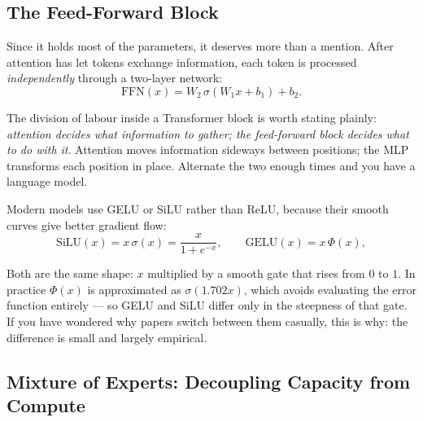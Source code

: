 \subsection{The Feed-Forward Block}

Since it holds most of the parameters, it deserves more than a mention.
After attention has let tokens exchange information, each token is processed
\emph{independently} through a two-layer network:
\begin{equation}
  \mathrm{FFN}(x) = W_2\,\sigma\!\left(W_1 x + b_1\right) + b_2 .
  \label{eq:dl-ffn}
\end{equation}

\begin{plainlanguage}
The division of labour inside a Transformer block is worth stating plainly:
\emph{attention decides what information to gather; the feed-forward block
decides what to do with it}. Attention moves information sideways between
positions; the MLP transforms each position in place. Alternate the two enough
times and you have a language model.
\end{plainlanguage}

Modern models use GELU or SiLU rather than ReLU, because their smooth curves
give better gradient flow:
\begin{equation}
  \mathrm{SiLU}(x) = x\,\sigma(x) = \frac{x}{1+e^{-x}},
  \qquad
  \mathrm{GELU}(x) = x\,\Phi(x),
  \label{eq:dl-gelu-silu}
\end{equation}

\begin{engineernote}
Both are the same shape: $x$ multiplied by a smooth gate that rises from $0$ to
$1$. In practice $\Phi(x)$ is approximated as $\sigma(1.702x)$, which avoids
evaluating the error function entirely --- so GELU and SiLU differ only in the
steepness of that gate. If you have wondered why papers switch between them
casually, this is why: the difference is small and largely empirical.
\end{engineernote}

\subsection{Mixture of Experts: Decoupling Capacity from Compute}


